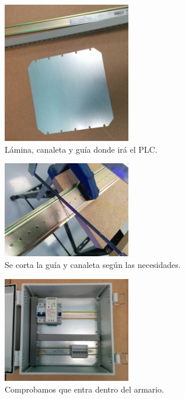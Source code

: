     \begin{figure}[H]
            \centering
            \includegraphics[width=0.5\textwidth]{images/cuadro/IMG_20150311_162414.jpg}
            \caption{Lámina, canaleta y guía donde irá el PLC.}
            \label{fig:cuad_montaje1}
    \end{figure}
    \begin{figure}[H]
            \centering
            \includegraphics[width=0.5\textwidth]{images/cuadro/IMG_20150311_164348.jpg}
            \caption{Se corta la guía y canaleta según las necesidades.}
            \label{fig:cuad_montaje2}
    \end{figure}
    \begin{figure}[H]
            \centering
            \includegraphics[width=0.5\textwidth]{images/cuadro/IMG_20150313_143943.jpg}
            \caption{Comprobamos que entra dentro del armario.}
            \label{fig:cuad_montaje3}
    \end{figure}
